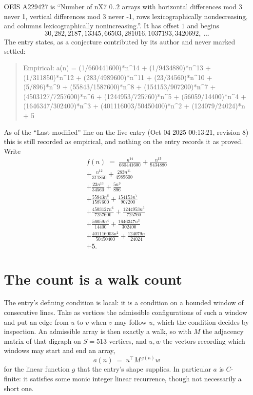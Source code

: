 \documentclass[11pt,a4paper]{article}
\theoremstyle{plain}
\theoremstyle{definition}
\begin{document}
OEIS A229427 is ``Number of nX7 0..2 arrays with horizontal differences mod 3 never 1, vertical differences mod 3 never -1, rows lexicographically nondecreasing, and columns lexicographically nonincreasing.''. It has offset $1$ and begins
\[
30, 282, 2187, 13345, 66503, 281016, 1037193, 3420692,\ \dots
\]
The entry states, as a conjecture contributed by its author and never marked settled:
\begin{quote}
Empirical: a(n) = (1/660441600)*n\^{}14 + (1/9434880)*n\^{}13 + (1/311850)*n\^{}12 + (283/4989600)*n\^{}11 + (23/34560)*n\^{}10 + (5/896)*n\^{}9 + (55843/1587600)*n\^{}8 + (154153/907200)*n\^{}7 + (4503127/7257600)*n\^{}6 + (1244953/725760)*n\^{}5 + (56059/14400)*n\^{}4 + (1646347/302400)*n\^{}3 + (401116003/50450400)*n\^{}2 + (124079/24024)*n + 5
\end{quote}
As of the ``Last modified'' line on the live entry (Oct 04 2025 00:13:21, revision 8) this is still
recorded as empirical, and nothing on the entry records it as proved. Write
\begin{multline*}
f(n)\;=\;\frac{n^{14}}{660441600} + \frac{n^{13}}{9434880} \\
+ \frac{n^{12}}{311850} + \frac{283 n^{11}}{4989600} \\
+ \frac{23 n^{10}}{34560} + \frac{5 n^{9}}{896} \\
+ \frac{55843 n^{8}}{1587600} + \frac{154153 n^{7}}{907200} \\
+ \frac{4503127 n^{6}}{7257600} + \frac{1244953 n^{5}}{725760} \\
+ \frac{56059 n^{4}}{14400} + \frac{1646347 n^{3}}{302400} \\
+ \frac{401116003 n^{2}}{50450400} + \frac{124079 n}{24024} \\
+ 5.
\end{multline*}

\section{The count is a walk count}

The entry's defining condition is local: it is a condition on a bounded window of consecutive lines. Take as vertices the
admissible configurations of such a window and put an edge from $u$ to $v$ when $v$ may
follow $u$, which the condition decides by inspection. An admissible array is then exactly a
walk, so with $M$ the adjacency matrix of that digraph on $S=513$ vertices, and $u,w$ the
vectors recording which windows may start and end an array,
\[
a(n)\;=\;u^{\!\top}M^{\,g(n)}w
\]
for the linear function $g$ that the entry's shape supplies. In particular $a$ is
$C$-finite: it satisfies some monic integer linear recurrence, though not necessarily a short
one.
\end{document}
